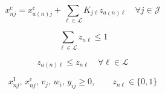 \documentclass{article}
\begin{document}
\begin{equation}
x_{nj}^{\mathrm c} = x_{a(n)j}^{\mathrm c} + \sum_{\ell \in \mathcal L} K_{j\ell} z_{a(n)\ell}
\quad \forall j \in \mathcal J
\tag{10d}
\end{equation}

\begin{equation}
\sum_{\ell \in \mathcal L} z_{n\ell} \le 1
\tag{10e}
\end{equation}

\begin{equation}
z_{a(n)\ell} \le z_{n\ell}
\quad \forall \ell \in \mathcal L
\tag{10f}
\end{equation}

\begin{equation}
x_{nj}^{\mathrm I},\, x_{nj}^{\mathrm c},\, v_j,\, w_i,\, y_{ij} \ge 0,\qquad
z_{n\ell} \in \{0,1\}
\tag{10g}
\end{equation}
\end{document}
